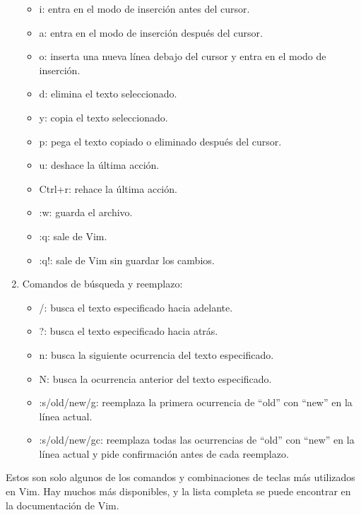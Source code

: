 \documentclass[
  a4paper,
]{article}
\providecommand{\tightlist}{%
  \setlength{\itemsep}{0pt}\setlength{\parskip}{0pt}}\usepackage{longtable,booktabs,array}
\begin{document}
\begin{enumerate}
  \begin{itemize}
  \tightlist
  \item
    i: entra en el modo de inserción antes del cursor.
  \item
    a: entra en el modo de inserción después del cursor.
  \item
    o: inserta una nueva línea debajo del cursor y entra en el modo de
    inserción.
  \item
    d: elimina el texto seleccionado.
  \item
    y: copia el texto seleccionado.
  \item
    p: pega el texto copiado o eliminado después del cursor.
  \item
    u: deshace la última acción.
  \item
    Ctrl+r: rehace la última acción.
  \item
    :w: guarda el archivo.
  \item
    :q: sale de Vim.
  \item
    :q!: sale de Vim sin guardar los cambios.
  \end{itemize}
\item
  Comandos de búsqueda y reemplazo:

  \begin{itemize}
  \tightlist
  \item
    /: busca el texto especificado hacia adelante.
  \item
    ?: busca el texto especificado hacia atrás.
  \item
    n: busca la siguiente ocurrencia del texto especificado.
  \item
    N: busca la ocurrencia anterior del texto especificado.
  \item
    :s/old/new/g: reemplaza la primera ocurrencia de ``old'' con ``new''
    en la línea actual.
  \item
    :s/old/new/gc: reemplaza todas las ocurrencias de ``old'' con
    ``new'' en la línea actual y pide confirmación antes de cada
    reemplazo.
  \end{itemize}
\end{enumerate}

Estos son solo algunos de los comandos y combinaciones de teclas más
utilizados en Vim. Hay muchos más disponibles, y la lista completa se
puede encontrar en la documentación de Vim.


\printbibliography
\end{document}
